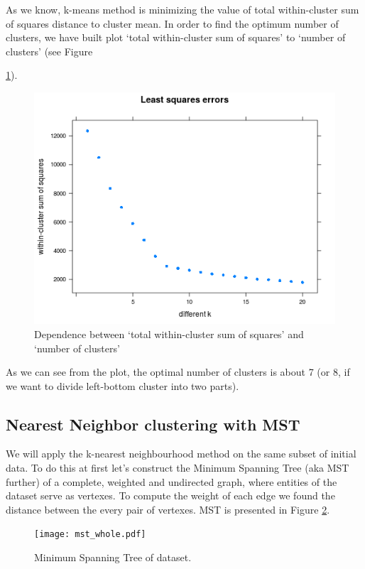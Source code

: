 As we know, k-means method is minimizing the value of total within-cluster sum of squares distance to cluster mean. 
In order to find the optimum number of clusters, we have built plot 
`total within-cluster sum of squares' to `number of clusters' (see Figure {\ref{fig:totalwithin-to-k}).

\begin{figure}[h]
	\centering
	\begin{minipage}[h]{0.49\linewidth}
\includegraphics[width=\linewidth]{images/totalwithin}
	\end{minipage}
	\caption{Dependence between `total within-cluster sum of squares' and `number of clusters'}
	\label{fig:totalwithin-to-k}	
\end{figure}

As we can see from the plot, the optimal number of clusters is about 7 (or 8, if we want to divide left-bottom cluster into two parts).

\subsection{Nearest Neighbor clustering with MST}
	We will apply the k-nearest neighbourhood method on the same subset of initial data. To do this at first let's construct the Minimum Spanning Tree (aka MST further) of a complete, weighted and undirected graph, where entities of the dataset serve as vertexes. To compute the weight of each edge we found the distance between the every pair of vertexes. MST is presented in Figure \ref{fig:mst_whole}.

\begin{figure}[h]
	\centering
	\begin{minipage}[h]{0.1\linewidth}
\texttt{[image: mst\_whole.pdf]}
	\end{minipage}
	\caption{Minimum Spanning Tree of dataset.}
	\label{fig:mst_whole}	
\end{figure}	
	
}
